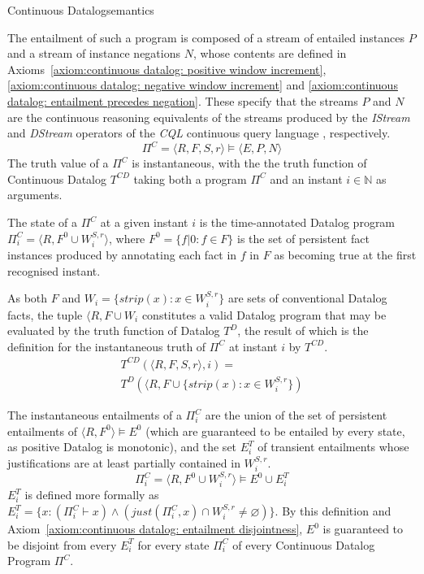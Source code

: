 \begin{nestedsection}{Continuous Datalog}{semantics}
\begin{definition}
The entailment of such a program is composed of a stream of entailed
instances $P$ and a stream of instance negations $N$, whose contents
are defined in 
Axioms~\ref{axiom:continuous datalog: positive window increment}, 
\ref{axiom:continuous datalog: negative window increment} and
\ref{axiom:continuous datalog: entailment precedes negation}. 
These specify that the streams $P$ and $N$ are the continuous
reasoning equivalents of the streams produced by the \emph{IStream}
and \emph{DStream} operators of the \emph{CQL} continuous query
language \citep{CQL}, respectively.
\[ \Pi^C = \langle R, F, S, r \rangle \vDash \langle E, P, N \rangle \]
The truth value of a $\Pi^C$ is instantaneous, with the the truth
function of Continuous Datalog $T^{CD}$ taking both a program ${\Pi^C}$
and an instant ${i \in \mathbb{N}}$ as arguments.
\end{definition}

\begin{definition}[State of a $\Pi^C$]\label{def:continuous datalog: CDPt}
The state of a $\Pi^C$ at a given instant $i$ is the time-annotated
Datalog program ${\Pi^C_i = \langle R, F^0 \cup W^{S,r}_{i} \rangle}$,
where ${F^0 = \{ f | 0 : f \in F \}}$ is the set of persistent fact instances produced by
annotating each fact in $f$ in $F$ as becoming true at the first recognised instant.

As both $F$ and ${W_i = \{ strip(x) : x \in W^{S,r}_{i} \}}$ are sets of conventional
Datalog facts, the tuple ${\langle R, F \cup W_i}$
constitutes a valid Datalog program that may be evaluated by the truth
function of Datalog $T^{D}$, the result of which is the definition for the
instantaneous truth of $\Pi^C$ at instant $i$ by $T^{CD}$.
\begin{multline*}
T^{CD} \left( \langle R, F, S, r \rangle, i \right) = \\
	T^{D} \left( \langle R, F \cup \{ strip(x) : x \in W^{S,r}_{i} \} \right)
\end{multline*}

The instantaneous entailments of a $\Pi^C_i$ are the union of the set of
persistent entailments of ${\langle R, F^0 \rangle \vDash E^0}$ (which are
guaranteed to be entailed by every state, as positive Datalog is monotonic),
and the set $E^T_{i}$ of transient entailments whose justifications are at
least partially contained in $W^{S,r}_i$.
\begin{equation*}
\Pi^C_i = \langle R, F^0 \cup W^{S,r}_{i} \rangle \vDash E^0 \cup E^T_{i}
\end{equation*}
$E^T_i$ is defined more formally as
${E^T_{i} = \{ x : \left( \Pi^C_i \vdash x \right) \wedge
\left( just(\Pi^C_i,x) \cap W^{S,r}_i \neq \varnothing \right) \}}$.
By this definition and Axiom~\ref{axiom:continuous datalog: entailment disjointness},
$E^0$ is guaranteed to be disjoint from every $E^T_i$
for every state $\Pi^C_i$ of every Continuous Datalog Program $\Pi^C$.
\end{definition}


\end{nestedsection}

